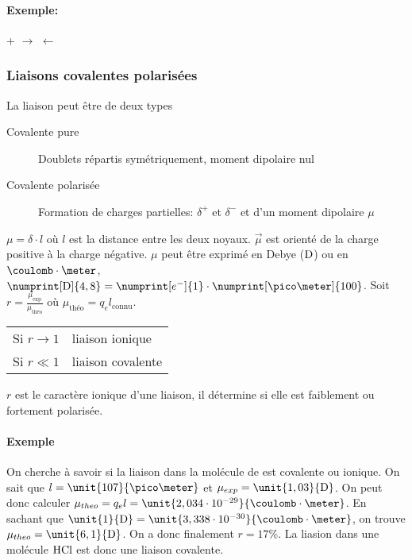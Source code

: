 \paragraph{Exemple:}
\begin{center}
  \hspace{0.3cm} + \hspace{0.3cm}$\longrightarrow$ $\leftarrow$
\end{center}
\subsubsection{Liaisons covalentes polarisées}
La liaison peut être de deux types
\begin{description}
  \item[Covalente pure] Doublets répartis symétriquement,
    moment dipolaire nul
  \item[Covalente polarisée] Formation de charges partielles:
    $\delta^+$ et $\delta^-$ et d'un moment dipolaire $\mu$
\end{description}
$\mu = \delta \cdot l$ où $l$ est la distance entre les deux noyaux.
$\vec{\mu}$ est orienté de la charge positive à la charge négative.
$\mu$ peut être exprimé en Debye ($\mathrm{D}$) ou en $\coulomb\cdot\meter$,
$\numprint[\debye]{4,8} = \numprint[e^-]{1} \cdot \numprint[\pico\meter]{100}$.
Soit $r = \frac{\mu_{\mathrm{exp}}}{\mu_{\textrm{théo}}}$
où $\mu_{\textrm{théo}} = q_e l_{\mathrm{connu}}$.
\begin{center}
  \begin{tabular}{ll}
    Si $r \to 1$ & liaison ionique\\
    Si $r \ll 1$ & liaison covalente
  \end{tabular}
\end{center}
$r$ est le caractère ionique d'une liaison,
il détermine si elle est faiblement ou fortement polarisée.

\paragraph{Exemple}
On cherche à savoir si la liaison dans la molécule de  est
covalente ou ionique. On sait que $l = \unit{107}{\pico\meter}$
et $\mu_{exp} = \unit{1,03}{\debye}$. On peut donc calculer
$\mu_{theo} = q_el = \unit{2,034 \cdot 10^{-29}}{\coulomb\cdot\meter}$. En
sachant que $\unit{1}{\debye} = \unit{3,338 \cdot 10^{-30}}{\coulomb\cdot\meter}$,
on trouve $\mu_{theo} = \unit{6,1}{\debye}$. On a donc finalement $r = 17\%$.
La liasion dans une molécule $\ce{HCl}$ est donc une liaison covalente.

